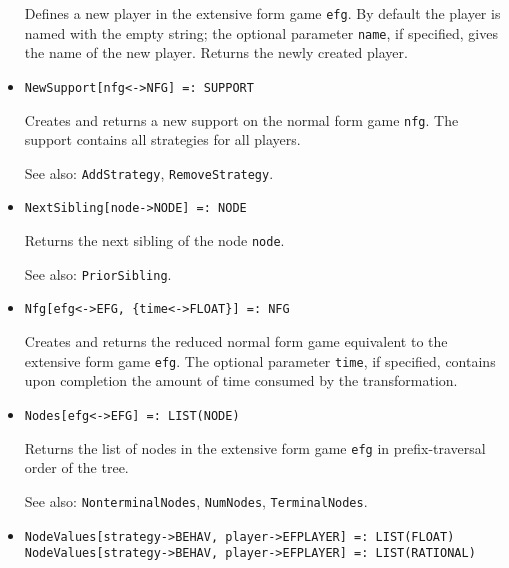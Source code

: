 \begin{itemize}
\bd
Defines a new player in the extensive form game \verb+efg+.
By default the player is named with the empty string; the optional parameter
\verb+name+, if specified, gives the name of the new player.  Returns the
newly created player.
\ed

\item
\protect \large \begin{verbatim}
NewSupport[nfg<->NFG] =: SUPPORT
\end{verbatim}\normalsize

\bd
Creates and returns a new support on the normal form
game \verb+nfg+.  The support contains all strategies for all players.
\item
[See also:] {\tt AddStrategy}, {\tt RemoveStrategy}.
\ed

\item
\protect \large \begin{verbatim}
NextSibling[node->NODE] =: NODE
\end{verbatim}\normalsize

\bd
Returns the next sibling of the node \verb+node+.
\item
[See also:] {\tt PriorSibling}.
\ed

\item
\protect \large \begin{verbatim}
Nfg[efg<->EFG, {time<->FLOAT}] =: NFG
\end{verbatim}\normalsize

\bd
Creates and returns the reduced normal form game equivalent
to the extensive form game \verb+efg+.  The optional parameter \verb+time+,
if specified, contains upon completion the amount of time consumed by
the transformation.
\ed

\item
\protect \large \begin{verbatim} 
Nodes[efg<->EFG] =: LIST(NODE)
\end{verbatim}\normalsize

\bd
Returns the list of nodes in the extensive form game
\verb+efg+ in prefix-traversal order of the tree.
\item
[See also:] {\tt NonterminalNodes}, {\tt NumNodes}, {\tt TerminalNodes}.
\ed

\item
\protect \large \begin{verbatim}
NodeValues[strategy->BEHAV, player->EFPLAYER] =: LIST(FLOAT)
NodeValues[strategy->BEHAV, player->EFPLAYER] =: LIST(RATIONAL)
\end{verbatim}\normalsize


\end{itemize}
